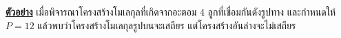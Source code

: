 \bigskip\noindent
\textbf{\uline{ตัวอย่าง}} 
เมื่อพิจารณาโครงสร้างโมเลกุลที่เกิดจากอะตอม 4 ลูกที่เชื่อมกันดังรูปทาง 
และกำหนดให้ $P=12$ แล้วพบว่าโครงสร้างโมเลกุลรูปบนจะเสถียร แต่โครงสร้างอันล่างจะไม่เสถียร

